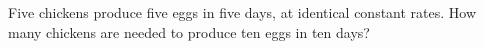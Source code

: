 Five chickens produce five eggs in five days, at identical constant rates. How many chickens are needed to produce ten eggs in ten days?
